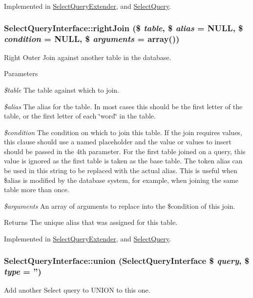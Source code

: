 Implemented in \hyperlink{classSelectQueryExtender_a83b472a48decf872faf61ded0c576697}{SelectQueryExtender}, and \hyperlink{classSelectQuery_a11a242cc59d1e2dee26848d5ab8de236}{SelectQuery}.\hypertarget{interfaceSelectQueryInterface_a563903061a31b87f34189a56d6f8a591}{
\subsubsection[{rightJoin}]{\setlength{\rightskip}{0pt plus 5cm}SelectQueryInterface::rightJoin (\$ {\em table}, \/  \$ {\em alias} = {\ttfamily NULL}, \/  \$ {\em condition} = {\ttfamily NULL}, \/  \$ {\em arguments} = {\ttfamily array()})}}
\label{interfaceSelectQueryInterface_a563903061a31b87f34189a56d6f8a591}
Right Outer Join against another table in the database.


\begin{DoxyParams}{Parameters}
\item[{\em \$table}]The table against which to join. \item[{\em \$alias}]The alias for the table. In most cases this should be the first letter of the table, or the first letter of each \char`\"{}word\char`\"{} in the table. \item[{\em \$condition}]The condition on which to join this table. If the join requires values, this clause should use a named placeholder and the value or values to insert should be passed in the 4th parameter. For the first table joined on a query, this value is ignored as the first table is taken as the base table. The token alias can be used in this string to be replaced with the actual alias. This is useful when \$alias is modified by the database system, for example, when joining the same table more than once. \item[{\em \$arguments}]An array of arguments to replace into the \$condition of this join. \end{DoxyParams}
\begin{DoxyReturn}{Returns}
The unique alias that was assigned for this table. 
\end{DoxyReturn}


Implemented in \hyperlink{classSelectQueryExtender_af2012b63276cf32b2422d342d257c835}{SelectQueryExtender}, and \hyperlink{classSelectQuery_a0b3a40164be944401296be9e9ab1c23c}{SelectQuery}.\hypertarget{interfaceSelectQueryInterface_a956f43a8444243b0233c7e182e4a424b}{
\subsubsection[{union}]{\setlength{\rightskip}{0pt plus 5cm}SelectQueryInterface::union ({\bf SelectQueryInterface} \$ {\em query}, \/  \$ {\em type} = {\ttfamily ''})}}
\label{interfaceSelectQueryInterface_a956f43a8444243b0233c7e182e4a424b}
Add another Select query to UNION to this one.

